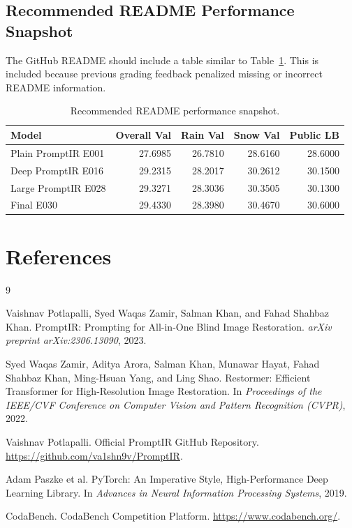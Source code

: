 \documentclass[10pt,conference]{article}
\begin{document}
\subsection{Recommended README Performance Snapshot}

The GitHub README should include a table similar to Table~\ref{tab:readme_snapshot}. This is included because previous grading feedback penalized missing or incorrect README information.

\begin{table}[H]
\centering
\caption{Recommended README performance snapshot.}
\label{tab:readme_snapshot}
\begin{tabular}{lrrrr}
\toprule
Model & Overall Val & Rain Val & Snow Val & Public LB \\
\midrule
Plain PromptIR E001 & 27.6985 & 26.7810 & 28.6160 & 28.6000 \\
Deep PromptIR E016 & 29.2315 & 28.2017 & 30.2612 & 30.1500 \\
Large PromptIR E028 & 29.3271 & 28.3036 & 30.3505 & 30.1300 \\
Final E030 & 29.4330 & 28.3980 & 30.4670 & 30.6000 \\
\bottomrule
\end{tabular}
\end{table}

\section{References}

\begin{thebibliography}{9}

Vaishnav Potlapalli, Syed Waqas Zamir, Salman Khan, and Fahad Shahbaz Khan.
\newblock PromptIR: Prompting for All-in-One Blind Image Restoration.
\newblock \emph{arXiv preprint arXiv:2306.13090}, 2023.

Syed Waqas Zamir, Aditya Arora, Salman Khan, Munawar Hayat, Fahad Shahbaz Khan, Ming-Hsuan Yang, and Ling Shao.
\newblock Restormer: Efficient Transformer for High-Resolution Image Restoration.
\newblock In \emph{Proceedings of the IEEE/CVF Conference on Computer Vision and Pattern Recognition (CVPR)}, 2022.

Vaishnav Potlapalli.
\newblock Official PromptIR GitHub Repository.
\newblock \url{https://github.com/va1shn9v/PromptIR}.

Adam Paszke et al.
\newblock PyTorch: An Imperative Style, High-Performance Deep Learning Library.
\newblock In \emph{Advances in Neural Information Processing Systems}, 2019.

CodaBench.
\newblock CodaBench Competition Platform.
\newblock \url{https://www.codabench.org/}.

\end{thebibliography}
\end{document}
